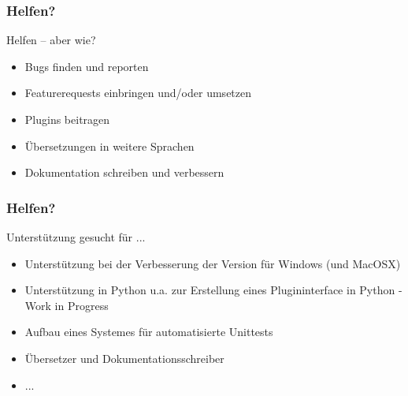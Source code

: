 \begin{frame}
	\frametitle{Helfen?}
	\begin{block}{Helfen -- aber wie?}
		\begin{itemize}
			\item Bugs finden und reporten
			\item Featurerequests einbringen und/oder umsetzen
			\item Plugins beitragen
			\item Übersetzungen in weitere Sprachen
			\item Dokumentation schreiben und verbessern
		\end{itemize}
	\end{block}
\end{frame}
\begin{frame}
	\frametitle{Helfen?}
	\begin{block}{Unterstützung gesucht für ... }
		\begin{itemize}
			\item Unterstützung bei der Verbesserung der Version für
				  Windows (und MacOSX)
			\item Unterstützung in Python u.a. zur Erstellung eines
				  Plugininterface in Python - Work in Progress
			\item Aufbau eines Systemes für automatisierte Unittests
			\item Übersetzer und Dokumentationsschreiber
			\item ...
		\end{itemize}
	\end{block}
\end{frame}
